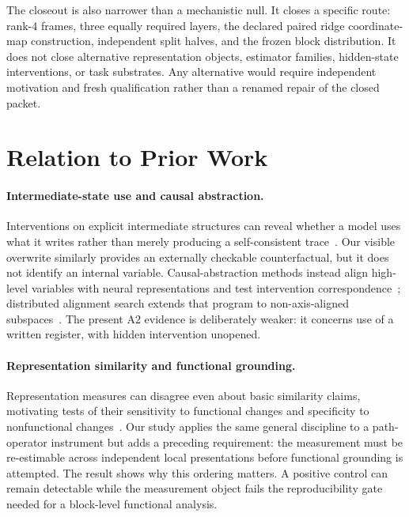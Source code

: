 \documentclass[10pt,a4paper]{article}
\begin{document}
The closeout is also narrower than a mechanistic null. It closes a specific route: rank-4 frames, three equally required layers, the declared paired ridge coordinate-map construction, independent split halves, and the frozen block distribution. It does not close alternative representation objects, estimator families, hidden-state interventions, or task substrates. Any alternative would require independent motivation and fresh qualification rather than a renamed repair of the closed packet.

\section{Relation to Prior Work}
\label{sec:related}

\paragraph{Intermediate-state use and causal abstraction.}
Interventions on explicit intermediate structures can reveal whether a model uses what it writes rather than merely producing a self-consistent trace~\cite{somov2026}. Our visible overwrite similarly provides an externally checkable counterfactual, but it does not identify an internal variable. Causal-abstraction methods instead align high-level variables with neural representations and test intervention correspondence~\cite{geiger2021}; distributed alignment search extends that program to non-axis-aligned subspaces~\cite{geiger2023das}. The present A2 evidence is deliberately weaker: it concerns use of a written register, with hidden intervention unopened.

\paragraph{Representation similarity and functional grounding.}
Representation measures can disagree even about basic similarity claims, motivating tests of their sensitivity to functional changes and specificity to nonfunctional changes~\cite{ding2021}. Our study applies the same general discipline to a path-operator instrument but adds a preceding requirement: the measurement must be re-estimable across independent local presentations before functional grounding is attempted. The result shows why this ordering matters. A positive control can remain detectable while the measurement object fails the reproducibility gate needed for a block-level functional analysis.
\end{document}
